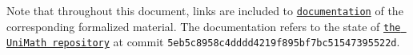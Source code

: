 Note that throughout this document, links are included to \href{https://arnoudvanderleer.github.io/cs-masters-thesis/toc.html}{\nolinkurl{documentation}} of the corresponding formalized material. The documentation refers to the state of \href{https://github.com/UniMath/UniMath/tree/5eb5c8958c4dddd4219f895bf7bc51547395522d}{\texttt{the UniMath repository}} at commit \texttt{5eb5c8958c4dddd4219f895bf7bc51547395522d}.
